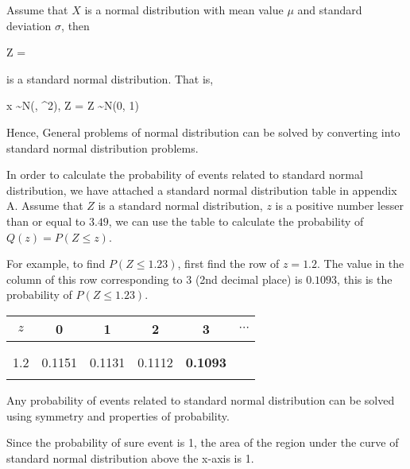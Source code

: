 \documentclass{report}
\begin{document}
\begin{multicols}{2}
  Assume that $X$ is a normal distribution with mean value $\mu$ and standard
  deviation $\sigma$, then
  \begin{cequation}
    Z = 
  \end{cequation}
  is a standard normal distribution. That is,
  \begin{cequation}
     x \sim N(\mu, \sigma^2),  Z = \text{, } Z \sim N(0, 1)
  \end{cequation}

  Hence, General problems of normal distribution can be solved by converting into
  standard normal distribution problems.

  In order to calculate the probability of events related to standard normal
  distribution, we have attached a standard normal distribution table in appendix
  A. Assume that $Z$ is a standard normal distribution, $z$ is a positive number
  lesser than or equal to $3.49$, we can use the table to calculate the
  probability of $Q(z) = P(Z \leq z)$.

  For example, to find $P(Z \leq 1.23)$, first find the row of $z = 1.2$. The
  value in the column of this row corresponding to 3 (2nd decimal place) is
  $0.1093$, this is the probability of $P(Z \leq 1.23)$.
  \begin{center}
    \begin{tabular}{|c|c|c|c|c|c|}
      \hline
      $z$ & 0      & 1                     & 2      & 3               & $\cdots$ \\
      \hline
          &        & \multicolumn{3}{c|}{} &                                     \\
          &        & \multicolumn{3}{c|}{} &                                     \\
      \hline
      1.2 & 0.1151 & 0.1131                & 0.1112 & \textbf{0.1093} &          \\
      \hline
          &        & \multicolumn{3}{c|}{} &                                     \\
      \hline
    \end{tabular}
  \end{center}

  Any probability of events related to standard normal distribution can be solved
  using symmetry and properties of probability.

  Since the probability of sure event is 1, the area of the region under the
  curve of standard normal distribution above the x-axis is 1.


\end{multicols}
\end{document}
